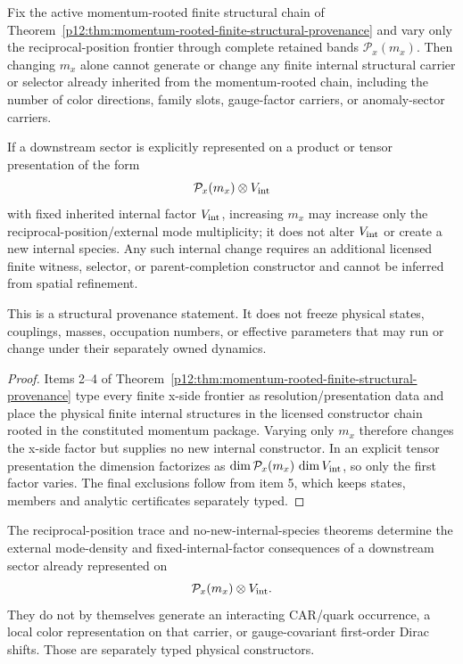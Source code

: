 \documentclass[12pt,a4paper]{article}
\begin{document}
\begin{corollary}
\label{p12:cor:v259-resolution-growth-no-internal-species}
Fix the active momentum-rooted finite structural chain of
Theorem~\ref{p12:thm:momentum-rooted-finite-structural-provenance} and vary
only the reciprocal-position frontier through complete retained bands
\(\mathcal P_x(m_x)\).  Then changing \(m_x\) alone cannot generate or change
any finite internal structural carrier or selector already inherited from the
momentum-rooted chain, including the number of color directions, family slots,
gauge-factor carriers, or anomaly-sector carriers.

If a downstream sector is explicitly represented on a product or tensor
presentation of the form
\[
 \mathcal P_x(m_x)\otimes V_{\rm int}
\]
with fixed inherited internal factor \(V_{\rm int}\), increasing \(m_x\) may
increase only the reciprocal-position/external mode multiplicity; it does not
alter \(V_{\rm int}\) or create a new internal species.  Any such internal
change requires an additional licensed finite witness, selector, or
parent-completion constructor and cannot be inferred from spatial refinement.

This is a structural provenance statement.  It does not freeze physical
states, couplings, masses, occupation numbers, or effective parameters that
may run or change under their separately owned dynamics.
\end{corollary}

\begin{proof}
Items 2--4 of
Theorem~\ref{p12:thm:momentum-rooted-finite-structural-provenance} type every
finite x-side frontier as resolution/presentation data and place the physical
finite internal structures in the licensed constructor chain rooted in the
constituted momentum package.  Varying only \(m_x\) therefore changes the
x-side factor but supplies no new internal constructor.  In an explicit tensor
presentation the dimension factorizes as
\(\dim\mathcal P_x(m_x)\,\dim V_{\rm int}\), so only the first factor varies.
The final exclusions follow from item 5, which keeps states, members and
analytic certificates separately typed.
\end{proof}

\begin{corollary}
\label{p12:cor:v2180-mode-density-not-sector-constructor}
The reciprocal-position trace and no-new-internal-species theorems determine
the external mode-density and fixed-internal-factor consequences of a
downstream sector already represented on
\[
 \mathcal P_x(m_x)\otimes V_{\rm int}.
\]
They do not by themselves generate an interacting CAR/quark occurrence, a
local color representation on that carrier, or gauge-covariant first-order
Dirac shifts.  Those are separately typed physical constructors.
\end{corollary}
\end{document}
